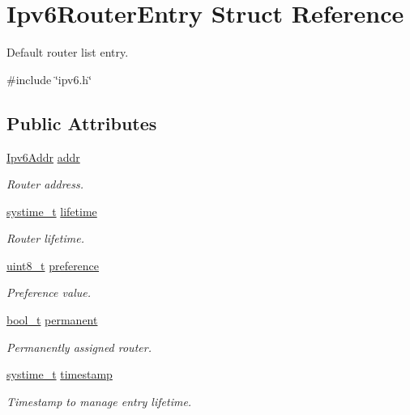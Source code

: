 \hypertarget{structIpv6RouterEntry}{}\section{Ipv6\+Router\+Entry Struct Reference}
\label{structIpv6RouterEntry}


Default router list entry.  




{\ttfamily \#include \char`\"{}ipv6.\+h\char`\"{}}

\subsection*{Public Attributes}
\begin{DoxyCompactItemize}
\item 
\hyperlink{ipv6_8h_aed0cbc40c61ed5b4fb681ebc55237e89}{Ipv6\+Addr} \hyperlink{structIpv6RouterEntry_ae229e171486421953e178c27b8527789}{addr}
\begin{DoxyCompactList}\small\item\em Router address. \end{DoxyCompactList}\item 
\hyperlink{compiler__port_8h_ae3e32a98d431a02106616da3071832dd}{systime\+\_\+t} \hyperlink{structIpv6RouterEntry_aed560238a63f534a2cecaf1c5eea614c}{lifetime}
\begin{DoxyCompactList}\small\item\em Router lifetime. \end{DoxyCompactList}\item 
\hyperlink{stdint_8h_aba7bc1797add20fe3efdf37ced1182c5}{uint8\+\_\+t} \hyperlink{structIpv6RouterEntry_ac637f0417fbe667ddb09990a366c8ad8}{preference}
\begin{DoxyCompactList}\small\item\em Preference value. \end{DoxyCompactList}\item 
\hyperlink{compiler__port_8h_a812d16e5494522586b3784e55d479912}{bool\+\_\+t} \hyperlink{structIpv6RouterEntry_a9b423514103cfe737922334c5f0d9ff2}{permanent}
\begin{DoxyCompactList}\small\item\em Permanently assigned router. \end{DoxyCompactList}\item 
\hyperlink{compiler__port_8h_ae3e32a98d431a02106616da3071832dd}{systime\+\_\+t} \hyperlink{structIpv6RouterEntry_a913df3ea3054f2f7c605e103196d9f65}{timestamp}
\begin{DoxyCompactList}\small\item\em Timestamp to manage entry lifetime. \end{DoxyCompactList}\end{DoxyCompactItemize}


